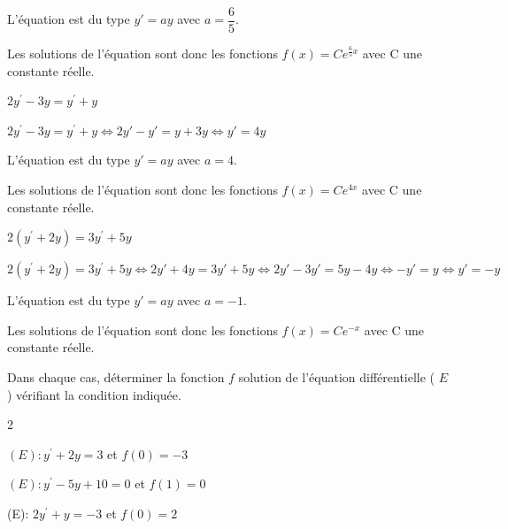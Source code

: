 \documentclass[11pt,a4paper]{article}  %
\begin{document}
\begin{enumMet}
\begin{corrBox}
		L'équation est du type $y'=ay$ avec $a=\dfrac{6}{5}$. 
		
		Les solutions de l'équation sont donc les fonctions $f(x)=Ce^{\frac{6}{5}x}$ avec C une constante réelle.		
	\end{corrBox}
	\item $2 y^{\prime}-3 y=y^{\prime}+y$
	\begin{corrBox}
		$2 y^{\prime}-3 y=y^{\prime}+y \iff 2y'-y'=y+3y\iff y'=4y$
		
		L'équation est du type $y'=ay$ avec $a=4$. 
		
		Les solutions de l'équation sont donc les fonctions $f(x)=Ce^{4x}$ avec C une constante réelle.		
	\end{corrBox}
	\item $2\left(y^{\prime}+2 y\right)=3 y^{\prime}+5 y$
	\begin{corrBox}
		$2\left(y^{\prime}+2 y\right)=3 y^{\prime}+5 y \iff 2y'+4y=3y'+5y\iff 2y'-3y'=5y-4y\iff -y'=y \iff y'=-y$
		
		L'équation est du type $y'=ay$ avec $a=-1$. 
		
		Les solutions de l'équation sont donc les fonctions $f(x)=Ce^{-x}$ avec C une constante réelle.		
	\end{corrBox}
\end{enumMet}

\exerciceDS{}

Dans chaque cas, déterminer la fonction $f$ solution de l'équation différentielle ( $E$ ) vérifiant la condition indiquée.
\begin{multicols}{2}
	\begin{enumMet}
	\item $(E): y^{\prime}+2 y=3$ et $f(0)=-3$
	\item $(E): y^{\prime}-5 y+10=0$ et $f(1)=0$
	\item (E): $2 y^{\prime}+y=-3$ et $f(0)=2$
\end{enumMet}
\end{multicols}

\newpage

\end{document}
